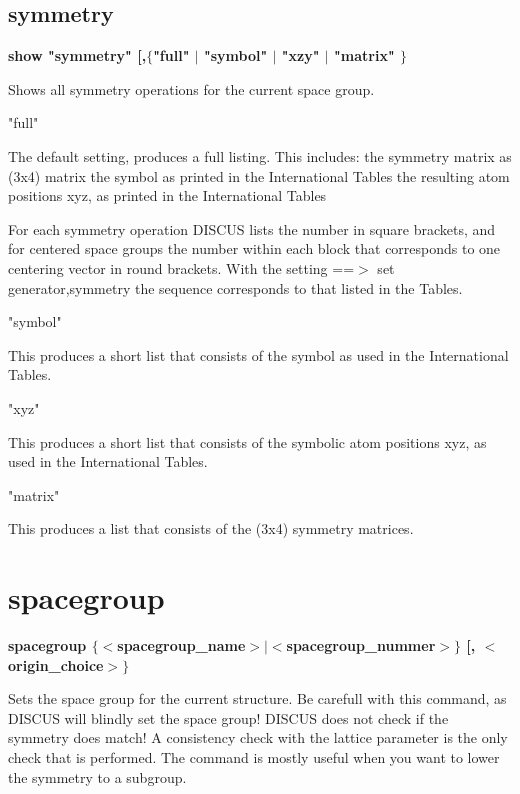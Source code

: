 \subsection*{symmetry}
{\bf show "symmetry" [,$ \{$"full" $| $ "symbol" $| $ "xzy" $| $ "matrix" $\} $ \par }
\par
\vspace{3pt}
Shows all symmetry operations for the current space group. 
\par
\begin{MacVerbatim}
"full"
\end{MacVerbatim}
The default setting, produces a full listing. This includes: 
    the symmetry matrix as (3x4) matrix 
    the symbol as printed in the International Tables 
    the resulting atom positions xyz, as printed in the International Tables 
\par
For each symmetry operation DISCUS lists the number in square brackets, 
and for centered space groups the number within each block that corresponds 
to one centering vector in round brackets. With the setting 
==$> $ set generator,symmetry the sequence corresponds to that listed 
in the Tables. 
\par
\begin{MacVerbatim}
"symbol"
\end{MacVerbatim}
This produces a short list that consists of the symbol as used in the 
International Tables. 
\par
\begin{MacVerbatim}
"xyz"
\end{MacVerbatim}
This produces a short list that consists of the symbolic atom positions 
xyz, as used in the International Tables. 
\par
\begin{MacVerbatim}
"matrix"
\end{MacVerbatim}
This produces a list that consists of the (3x4) symmetry matrices. 
\section{spacegroup}
{\bf spacegroup $ \{$$ <$spacegroup\_name$> $$| $$ <$spacegroup\_nummer$> $$\} $ [, $ <$origin\_choice$> $$\} $ \par }
\par
\vspace{3pt}
Sets the space group for the current structure. 
Be carefull with this command, as DISCUS will blindly set the space group! 
DISCUS does not check if the symmetry does match! 
A consistency check with the lattice parameter is the only check that 
is performed. 
The command is mostly useful when you want to lower the symmetry to 
a subgroup. 
